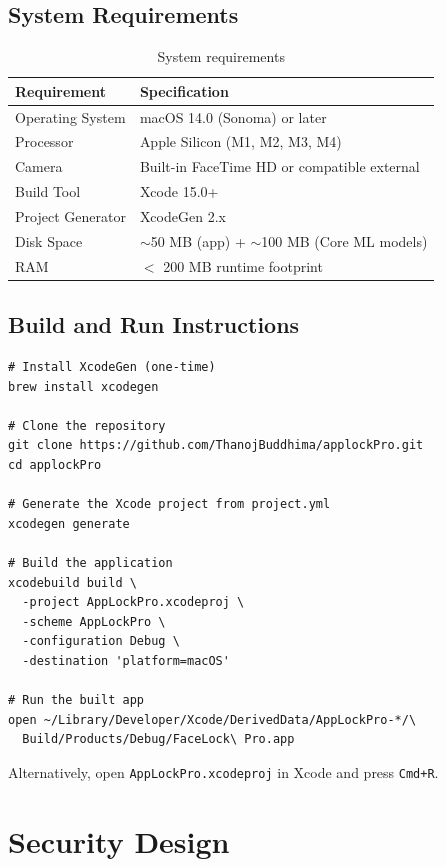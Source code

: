 \documentclass[12pt,a4paper]{report}
\begin{document}
\section{System Requirements}
\begin{table}[H]
\centering
\begin{tabular}{ll}
\toprule
\textbf{Requirement} & \textbf{Specification} \\
\midrule
Operating System & macOS 14.0 (Sonoma) or later \\
Processor & Apple Silicon (M1, M2, M3, M4) \\
Camera & Built-in FaceTime HD or compatible external \\
Build Tool & Xcode 15.0+ \\
Project Generator & XcodeGen 2.x \\
Disk Space & $\sim$50 MB (app) + $\sim$100 MB (Core ML models) \\
RAM & $<$ 200 MB runtime footprint \\
\bottomrule
\end{tabular}
\caption{System requirements}
\end{table}

\section{Build and Run Instructions}
\begin{lstlisting}[caption={Building from the command line}]
# Install XcodeGen (one-time)
brew install xcodegen

# Clone the repository
git clone https://github.com/ThanojBuddhima/applockPro.git
cd applockPro

# Generate the Xcode project from project.yml
xcodegen generate

# Build the application
xcodebuild build \
  -project AppLockPro.xcodeproj \
  -scheme AppLockPro \
  -configuration Debug \
  -destination 'platform=macOS'

# Run the built app
open ~/Library/Developer/Xcode/DerivedData/AppLockPro-*/\
  Build/Products/Debug/FaceLock\ Pro.app
\end{lstlisting}

Alternatively, open \texttt{AppLockPro.xcodeproj} in Xcode and press \texttt{Cmd+R}.

\chapter{Security Design}
\end{document}
